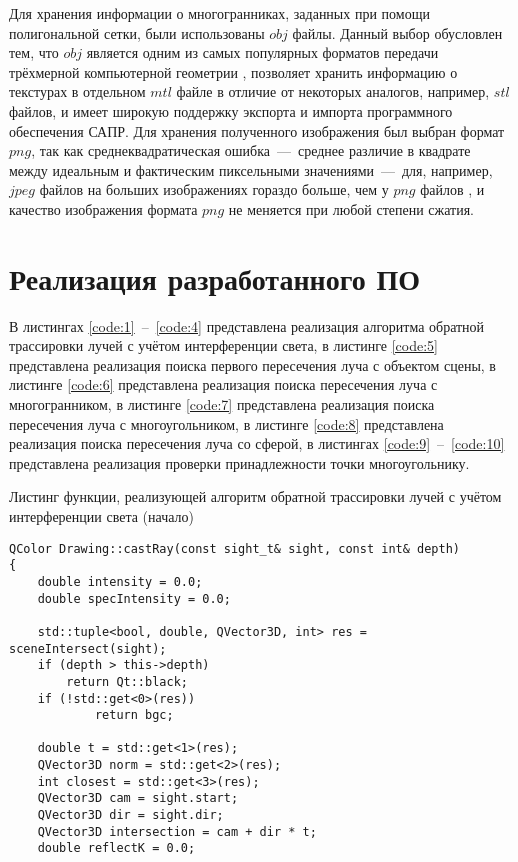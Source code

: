 Для хранения информации о многогранниках, заданных при помощи полигональной сетки, были использованы $obj$ файлы. Данный выбор обусловлен тем, что $obj$ является одним из самых популярных форматов передачи трёхмерной компьютерной геометрии \cite{web_item18}, позволяет хранить информацию о текстурах в отдельном $mtl$ файле в отличие от некоторых аналогов, например, $stl$ файлов, и имеет широкую поддержку экспорта и импорта программного обеспечения САПР. Для хранения полученного изображения был выбран формат $png$, так как среднеквадратическая ошибка~---~среднее различие в квадрате между идеальным и фактическим пиксельными значениями~---~для, например, $jpeg$ файлов на больших изображениях гораздо больше, чем у $png$ файлов \cite{web_item19}, и качество изображения формата $png$ не меняется при любой степени сжатия.

\section{Реализация разработанного ПО}
В листингах \ref{code:1}~--~\ref{code:4} представлена реализация алгоритма обратной трассировки лучей с учётом интерференции света, в листинге \ref{code:5} представлена реализация поиска первого пересечения луча с объектом сцены, в листинге \ref{code:6} представлена реализация поиска пересечения луча с многогранником, в листинге \ref{code:7} представлена реализация поиска пересечения луча с многоугольником, в листинге \ref{code:8} представлена реализация поиска пересечения луча со сферой, в листингах \ref{code:9}~--~\ref{code:10} представлена реализация проверки принадлежности точки многоугольнику.

\begin{code}
\caption{Листинг функции, реализующей алгоритм обратной трассировки лучей с учётом интерференции света (начало)}
\label{code:1}
\begin{verbatim}
QColor Drawing::castRay(const sight_t& sight, const int& depth)
{
    double intensity = 0.0;
    double specIntensity = 0.0;

    std::tuple<bool, double, QVector3D, int> res = sceneIntersect(sight);
    if (depth > this->depth)
        return Qt::black;
    if (!std::get<0>(res))
            return bgc;

    double t = std::get<1>(res);
    QVector3D norm = std::get<2>(res);
    int closest = std::get<3>(res);
    QVector3D cam = sight.start;
    QVector3D dir = sight.dir;
    QVector3D intersection = cam + dir * t;
    double reflectK = 0.0;
\end{verbatim}
\end{code}

